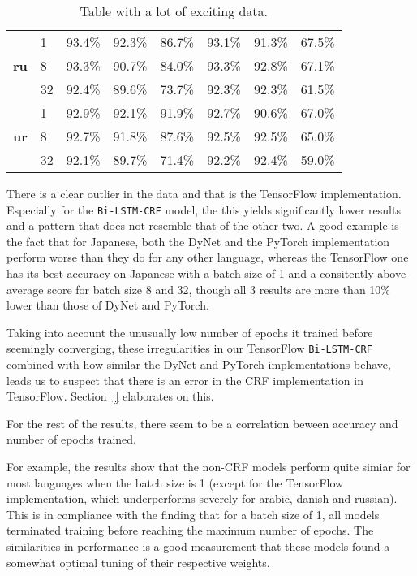 \begin{table}[h]
\begin{tabular}{c l c c c|c c c}
        \cmidrule(lr){1-8}
        \multirow{3}{*}{\bfseries ru}
        &  1 & 93.4\% & 92.3\% & 86.7\% & 93.1\% & 91.3\% & 67.5\% \\
        &  8 & 93.3\% & 90.7\% & 84.0\% & 93.3\% & 92.8\% & 67.1\% \\
        & 32 & 92.4\% & 89.6\% & 73.7\% & 92.3\% & 92.3\% & 61.5\% \\

        \cmidrule(lr){1-8}
        \multirow{3}{*}{\bfseries ur}
        &  1 & 92.9\% & 92.1\% & 91.9\% & 92.7\% & 90.6\% & 67.0\% \\
        &  8 & 92.7\% & 91.8\% & 87.6\% & 92.5\% & 92.5\% & 65.0\% \\
        & 32 & 92.1\% & 89.7\% & 71.4\% & 92.2\% & 92.4\% & 59.0\% \\
        \bottomrule
    \end{tabular}
    \caption{Table with a lot of exciting data.
    }\label{table:acc-total-pos}
\end{table}


There is a clear outlier in the data and that is the TensorFlow implementation.
Especially for the \texttt{Bi-LSTM-CRF} model, the this yields significantly
lower results and a pattern that does not resemble that of the other two. A good
example is the fact that for Japanese, both the DyNet and the PyTorch
implementation perform worse than they do for any other language, whereas the
TensorFlow one has its best accuracy on Japanese with a batch size of 1 and  a
consitently above-average score for batch size 8 and 32, though all 3 results
are more than 10\% lower than those of DyNet and PyTorch.

Taking into account the unusually low number of epochs it trained before
seemingly converging, these irregularities in our TensorFlow
\texttt{Bi-LSTM-CRF} combined with how similar the DyNet and PyTorch
implementations behave, leads us to suspect that there is an error in the CRF
implementation in TensorFlow. Section~\ref{} elaborates on this.

For the rest of the results, there seem to be a correlation beween accuracy and
number of epochs trained.

For example, the results show that the non-CRF models perform quite simiar for
most languages when the batch size is 1 (except for the TensorFlow
implementation, which underperforms severely for arabic, danish and russian).
This is in compliance with the finding that for a batch size of 1, all models
terminated training before reaching the maximum number of epochs. The
similarities in performance is a good measurement that these models found a
somewhat optimal tuning of their respective weights.

